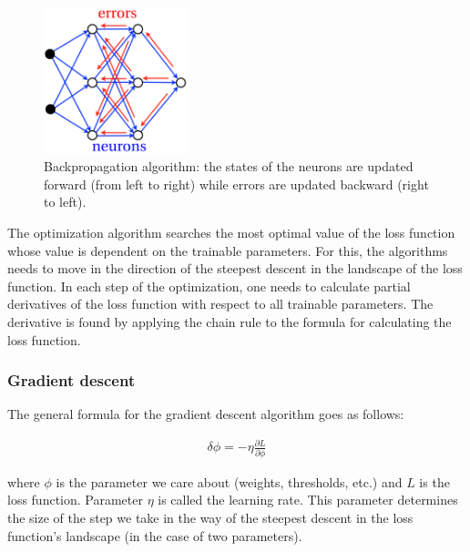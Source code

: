 \vspace{3mm}
\begin{figure}[htb]
	\begin{center}
		\includegraphics*[width=4.2cm, keepaspectratio]{obr/backpropagation.png}
	\end{center}
	\vspace{3mm}
	\caption{Backpropagation algorithm: the states of the neurons are updated forward
		(from left to right) while errors are updated backward (right to left). \cite{mehlig}} 
	\label{backprop}	
\end{figure}


The optimization algorithm searches the most optimal value of the loss function whose value is dependent on the trainable parameters. For this, the algorithms needs to move in the direction of the steepest descent in the landscape of the loss function. In each step of the optimization, one needs to calculate partial derivatives of the loss function with respect to all trainable parameters. The derivative is found by applying the chain rule to the formula for calculating the loss function. \cite{mehlig}

\subsubsection{Gradient descent}

The general formula for the gradient descent algorithm goes as follows: \cite{notes}

\begin{gather}
	\delta \phi = - \eta \frac{\partial L}{\partial \phi}
\end{gather}

\noindent where $ \phi $ is the parameter we care about (weights, thresholds, etc.) and $ L $ is the loss function. Parameter $ \eta $ is called the learning rate. This parameter determines the size of the step we take in the way of the steepest descent in the loss function's landscape (in the case of two parameters). \cite{notes}

